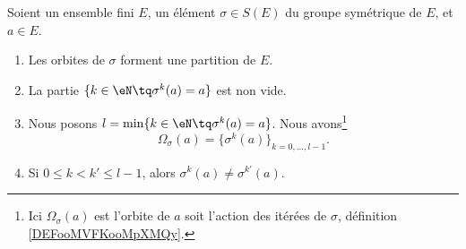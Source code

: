 \begin{proposition}	\label{PROPooSWEYooGRYvcM}
	Soient un ensemble fini \( E\), un élément \( \sigma\in S(E)\) du groupe symétrique de \( E\), et \( a\in E\).
	\begin{enumerate}
		\item		\label{ITEMooSAMGooPDGCwF}
		      Les orbites de \( \sigma\) forment une partition de \( E\).
		\item		\label{ITEMooXPPWooOFqwBl}
		      La partie \( \{ k\in \eN\tq \sigma^k(a)=a \}\) est non vide.
		\item		\label{ITEMooBOHSooJScjxU}
		      Nous posons \( l=\min\{ k\in \eN\tq \sigma^k(a)=a \}\). Nous avons\footnote{Ici \( \Omega_{\sigma}(a)\) est l'orbite de \( a\) soit l'action des itérées de \( \sigma\), définition \ref{DEFooMVFKooMpXMQy}.}
		      \begin{equation}
			      \Omega_{\sigma}(a)=\{ \sigma^k(a) \}_{k=0,\ldots,l-1}.
		      \end{equation}
		\item	\label{ITEMooBWCKooZeKtyM}
		      Si \( 0\leq k<k'\leq l-1\), alors \( \sigma^k(a)\neq \sigma^{k'}(a)\).
	\end{enumerate}
\end{proposition}


